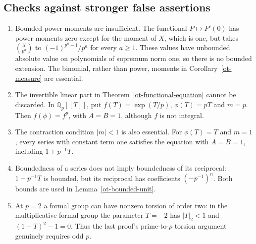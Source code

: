 \subsection{Checks against stronger false assertions}

\begin{enumerate}
\item Bounded power moments are insufficient.  The functional
$P\mapsto P'(0)$ has power moments zero except for the moment of
$X$, which is one, but takes $\binom X{p^a}$ to
$(-1)^{p^a-1}/p^a$ for every $a\ge1$.  These values have
unbounded absolute value on polynomials of supremum norm one,
so there is no bounded extension.  The binomial, rather than power, moments in
Corollary~\ref{ot-measure} are essential.
\item The invertible linear part in
Theorem~\ref{ot-functional-equation} cannot be discarded.  In
$\mathbb Q_p[[T]]$, put
$f(T)=\exp(T/p)$, $\phi(T)=pT$ and $m=p$.  Then
$f(\phi)=f^p$, with $A=B=1$, although $f$ is not integral.
\item The contraction condition $|m|<1$ is also essential.
For $\phi(T)=T$ and $m=1$, every series with constant term one
satisfies the equation with $A=B=1$, including $1+p^{-1}T$.
\item Boundedness of a series does not imply boundedness of its
reciprocal: $1+p^{-1}T$ is bounded, but its reciprocal has
coefficients $(-p^{-1})^n$.  Both bounds are used in
Lemma~\ref{ot-bounded-unit}.
\item At $p=2$ a formal group can have nonzero torsion of order
two: in the multiplicative formal group the parameter $T=-2$
has $|T|_2<1$ and $(1+T)^2-1=0$.  Thus the last proof's
prime-to-$p$ torsion argument genuinely requires odd $p$.
\end{enumerate}


